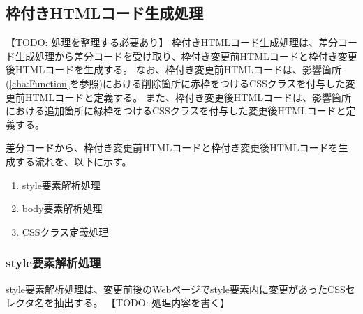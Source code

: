 
\subsection{枠付きHTMLコード生成処理}\label{subsec:modified_html_generate}
【TODO: 処理を整理する必要あり】
枠付きHTMLコード生成処理は、差分コード生成処理から差分コードを受け取り、枠付き変更前HTMLコードと枠付き変更後HTMLコードを生成する。
なお、枠付き変更前HTMLコードは、影響箇所(\ref{cha:Function}を参照)における削除箇所に赤枠をつけるCSSクラスを付与した変更前HTMLコードと定義する。
また、枠付き変更後HTMLコードは、影響箇所における追加箇所に緑枠をつけるCSSクラスを付与した変更後HTMLコードと定義する。
\par
差分コードから、枠付き変更前HTMLコードと枠付き変更後HTMLコードを生成する流れを、以下に示す。
\begin{enumerate}
    \item style要素解析処理
    \item body要素解析処理
    \item CSSクラス定義処理
\end{enumerate}

\subsubsection{style要素解析処理}
style要素解析処理は、変更前後のWebページでstyle要素内に変更があったCSSセレクタ名を抽出する。
【TODO: 処理内容を書く】


